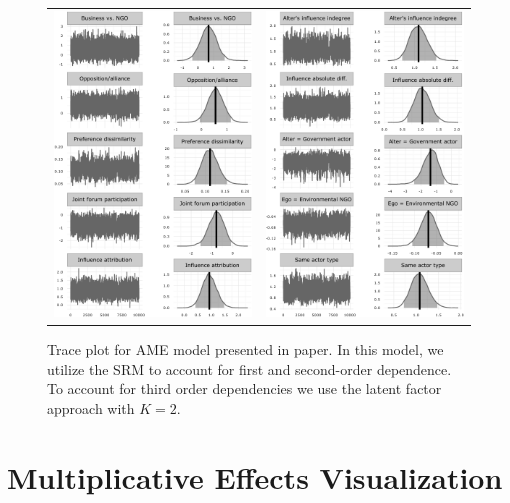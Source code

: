 \documentclass[12pt,pdflatex]{elsarticle}
\begin{document}
\begin{figure}[ht]
	\centering
	\begin{tabular}{cc}
	\includegraphics[width=.45\textwidth]{ameConv1_SR2} &
	\includegraphics[width=.45\textwidth]{ameConv2_SR2}
	\end{tabular}
	\caption{Trace plot for AME model presented in paper. In this model, we utilize the SRM to account for first and second-order dependence. To account for third order dependencies we use the latent factor approach with $K=2$.}
	\label{fig:ameConv}
\end{figure}
\FloatBarrier
\newpage

\section*{Multiplicative Effects Visualization}
\end{document}
